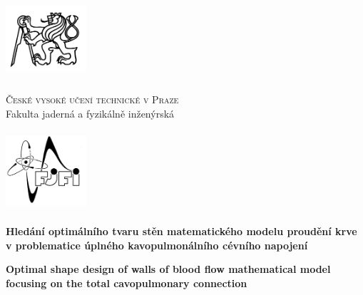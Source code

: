 \def\documentdate{21. kv\v{e}tna 2023}


\pagestyle{empty}
{\centering

\noindent %
\begin{minipage}[c]{3cm}%
\noindent \begin{center}
\includegraphics[width=3cm,height=3cm,keepaspectratio]{Images/TITLE/cvut}
\par\end{center}%
\end{minipage}%
\begin{minipage}[c]{0.6\linewidth}%
\begin{center}
\textsc{\large{}České vysoké učení technické v Praze}{\large{}}\\
{\large{}Fakulta jaderná a fyzikálně inženýrská}
\par\end{center}%
\end{minipage}%
\begin{minipage}[c]{3cm}%
\noindent \begin{center}
\includegraphics[width=3cm,height=3cm,keepaspectratio]{Images/TITLE/fjfi}
\par\end{center}%
\end{minipage}

\vspace{3cm}

\textbf{\huge{}Hledání optimálního tvaru stěn matematického modelu proudění krve v problematice úplného kavopulmonálního cévního napojení}{\huge\par}

\vspace{1cm}

%
\textbf{\huge{}Optimal shape design of walls of blood flow mathematical model focusing on the total cavopulmonary connection}{\huge\par}

}
